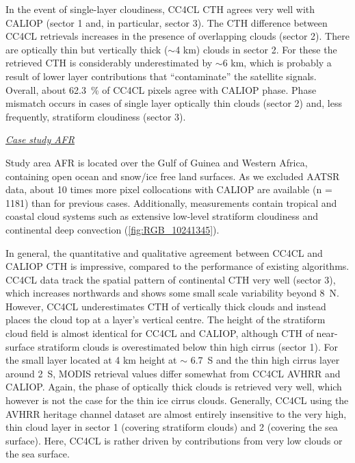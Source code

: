 In the event of single-layer cloudiness, CC4CL CTH agrees very well with CALIOP (sector 1 and, in particular, sector 3). The CTH difference between CC4CL retrievals increases in the presence of overlapping clouds (sector 2). There are optically thin but vertically thick ($\sim$4 km) clouds in sector 2. For these the retrieved CTH is considerably underestimated by $\sim$6 km, which is probably a result of lower layer contributions that ``contaminate'' the satellite signals. Overall, about 62.3~\% of CC4CL pixels agree with CALIOP phase. Phase mismatch occurs in cases of single layer optically thin clouds (sector 2) and, less frequently, stratiform cloudiness (sector 3).

\vspace{5mm}\underline{\textit{Case study AFR}}\vspace{2mm}

Study area AFR is located over the Gulf of Guinea and Western Africa, containing open ocean and snow/ice free land surfaces. As we excluded AATSR data, about 10 times more pixel collocations with CALIOP are available (n = 1181) than for previous cases. Additionally, measurements contain tropical and coastal cloud systems such as extensive low-level stratiform cloudiness and continental deep convection (\cref{fig:RGB_10241345}).

In general, the quantitative and qualitative agreement between CC4CL and CALIOP CTH is impressive, compared to the performance of existing algorithms. CC4CL data track the spatial pattern of continental CTH very well (sector 3), which increases northwards and shows some small scale variability beyond 8\textdegree\ N. However, CC4CL underestimates CTH of vertically thick clouds and instead places the cloud top at a layer's vertical centre. The height of the stratiform cloud field is almost identical for CC4CL and CALIOP, although CTH of near-surface stratiform clouds is overestimated below thin high cirrus (sector 1). For the small layer located at 4 km height at $\sim$ 6.7\textdegree\ S and the thin high cirrus layer around 2\textdegree\ S, MODIS retrieval values differ somewhat from CC4CL AVHRR and CALIOP. Again, the phase of optically thick clouds is retrieved very well, which however is not the case for the thin ice cirrus clouds. Generally, CC4CL using the AVHRR heritage channel dataset are almost entirely insensitive to the very high, thin cloud layer in sector 1 (covering stratiform clouds) and 2 (covering the sea surface). Here, CC4CL is rather driven by contributions from very low clouds or the sea surface. 

